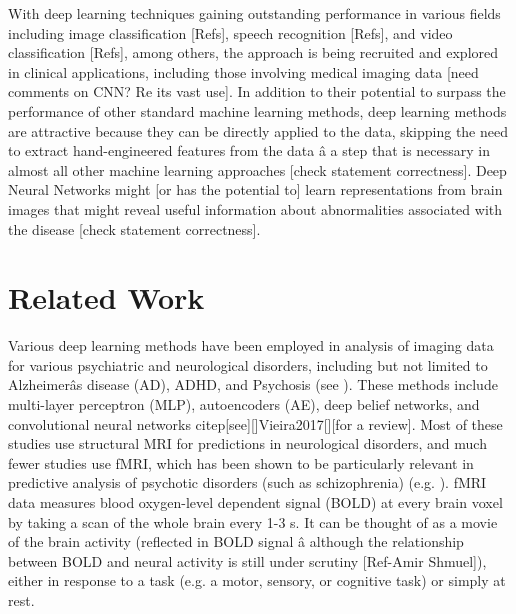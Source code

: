 \documentclass{article}
\begin{document}
With deep learning techniques gaining outstanding performance in various fields including image classification [Refs], speech recognition [Refs], and video classification [Refs], among others, the approach is being recruited and explored in clinical applications, including those involving medical imaging data \citep{Shen2017, Litjens2017, Gulshan2016} [need comments on CNN? Re its vast use]. In addition to their potential to surpass the performance of other standard machine learning methods, deep learning methods are attractive because they can be directly applied to the data, skipping the need to extract hand-engineered features from the data â a step that is necessary in almost all other machine learning approaches [check statement correctness]. Deep Neural Networks might [or has the potential to] learn representations from brain images that might reveal useful information about abnormalities associated with the disease [check statement correctness].
\section{Related Work}
Various deep learning methods have been employed in analysis of imaging data for various psychiatric and neurological disorders, including but not limited to Alzheimerâs disease (AD), ADHD, and Psychosis (see \citep{Vieira2017}). These methods include multi-layer perceptron (MLP), autoencoders (AE), deep belief networks, and convolutional neural networks citep[see][]{Vieira2017}[][for a review]. Most of these studies use structural MRI for predictions in neurological disorders, and much fewer studies use fMRI, which has been shown to be particularly relevant in predictive analysis of psychotic disorders (such as schizophrenia) (e.g. \citep{Damaraju2014, Calhoun2009}). fMRI data measures blood oxygen-level dependent signal (BOLD) at every brain voxel by taking a scan of the whole brain every 1-3 s. It can be thought of as a movie of the brain activity (reflected in BOLD signal â although the relationship between BOLD and neural activity is still under scrutiny [Ref-Amir Shmuel]), either in response to a task (e.g. a motor, sensory, or cognitive task) or simply at rest.
\end{document}
